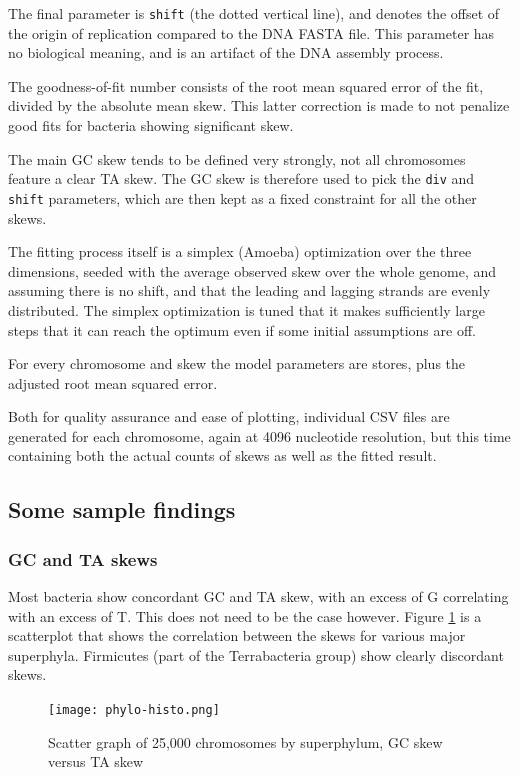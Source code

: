 \documentclass[fleqn,10pt]{wlscirep}
\begin{document}
The final parameter is {\tt shift} (the dotted vertical line), and denotes the offset of the origin of replication compared to the DNA FASTA file. This parameter has no biological meaning, and is an artifact of the DNA assembly process. 

The goodness-of-fit number consists of the root mean squared error of the fit, divided by the absolute mean skew. This latter correction is made to not penalize good fits for bacteria showing significant skew.

The main GC skew tends to be defined very strongly, not all chromosomes feature a clear TA skew. The GC skew is therefore used to pick the {\tt div} and {\tt shift} parameters, which are then kept as a fixed constraint for all the other skews.

The fitting process itself is a simplex (Amoeba) optimization over the three dimensions, seeded with the average observed skew over the whole genome, and assuming there is no shift, and that the leading and lagging strands are evenly distributed. The simplex optimization is tuned that it makes sufficiently large steps that it can reach the optimum even if some initial assumptions are off.

For every chromosome and skew the model parameters are stores, plus the adjusted root mean squared error.

Both for quality assurance and ease of plotting, individual CSV files are generated for each chromosome, again at 4096 nucleotide resolution, but this time containing both the actual counts of skews as well as the fitted result.
  
\subsection*{Some sample findings}
\subsubsection*{GC and TA skews}
Most bacteria show concordant GC and TA skew, with an excess of G correlating with an excess of T. This does not need to be the case however. Figure \ref{fig:gc-ta-scatter} is a scatterplot that shows the correlation between the skews for various major superphyla. Firmicutes (part of the Terrabacteria group) show clearly discordant skews.

\begin{figure}[ht]
\centering
\texttt{[image: phylo-histo.png]}
\caption{Scatter graph of 25,000 chromosomes by superphylum, GC skew versus TA skew}
\label{fig:gc-ta-scatter}
\end{figure}
\end{document}
